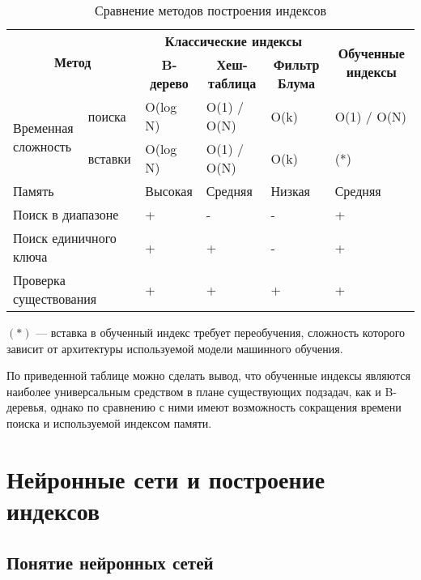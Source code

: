{
\fontsize{14pt}{14pt}\selectfont
\captionsetup{format=hang,justification=raggedleft,
              singlelinecheck=off,width=17cm}
\renewcommand{\arraystretch}{1.5}
\begin{longtable}[Hc]{|p{3cm}|p{1.5cm}|p{2cm}|p{3cm}|p{2cm}|p{2.5cm}|}
    \caption{Сравнение методов построения индексов\label{tab:01}}\\
    \hline
    \multicolumn{2}{|c|}{\multirow{2}{*}{\textbf{Метод}}} &
    \multicolumn{3}{|c|}{\textbf{Классические индексы}} &
    \multicolumn{1}{c|}{\multirow{2}{*}{\parbox{2.5cm}{
        \centering\textbf{Обученные индексы}}}}\\
    \cline{3-5}
    \multicolumn{2}{|c|}{} & \multicolumn{1}{c|}{\textbf{B-дерево}} &
    \multicolumn{1}{c|}{\textbf{Хеш-таблица}} &
    \multicolumn{1}{c|}{\parbox{2cm}{\centering\textbf{Фильтр Блума}}} & \\
    \hline
    \multirow{2}{*}{\parbox{3cm}{Временная\\сложность}} &
    поиска & O(log N) & O(1) / O(N) & O(k) & O(1) / O(N)\\
    \cline{2-6}
    & вставки & O(log N) & O(1) / O(N) & O(k) & (*)\\
    \hline
    \multicolumn{2}{|l|}{Память} & Высокая & Средняя & Низкая & Средняя\\
    \hline
    \multicolumn{2}{|l|}{Поиск в диапазоне} & + & - & - & + \\
    \hline
    \multicolumn{2}{|l|}{Поиск единичного ключа} & + & + & - & + \\
    \hline
    \multicolumn{2}{|l|}{Проверка существования} & + & + & + & + \\
    \hline
\end{longtable}
}

$(*)$ --- вставка в обученный индекс требует переобучения, сложность которого
зависит от архитектуры используемой модели машинного обучения.

По приведенной таблице можно сделать вывод, что обученные индексы являются
наиболее универсальным средством в плане существующих подзадач, как и B-деревья,
однако по сравнению с ними имеют возможность сокращения времени поиска и
используемой индексом памяти.

\section{Нейронные сети и построение индексов\label{classification}}

\subsection{Понятие нейронных сетей}

